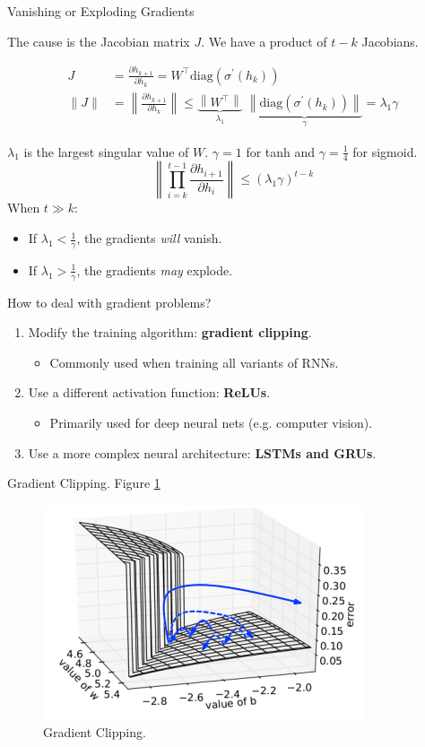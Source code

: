 \documentclass[english]{article}
\begin{document}
\item 
 {Vanishing or Exploding Gradients}

The cause is the Jacobian matrix $J$. We have a product of $t-k$ Jacobians.

\begin{align*}
J&=\frac{\partial h_{k+1}}{\partial h_k}=W^\top\text{diag}(\sigma^\prime(h_k))\\
\|J\|&=\left\|\frac{\partial h_{k+1}}{\partial h_k}\right\|\leq\underbrace{\left\|W^\top\right\|}_{\lambda_1}\;\underbrace{\left\|\text{diag}(\sigma^\prime(h_k))\right\|}_{\gamma}=\lambda_1\gamma
\end{align*}

$\lambda_1$ is the largest singular value of $W$. $\gamma=1$ for tanh and $\gamma=\frac{1}{4}$ for sigmoid.
$$\left\|\prod_{i=k}^{t-1}\frac{\partial h_{i+1}}{\partial h_i}\right\| \leq (\lambda_1\gamma)^{t-k}$$
When $t \gg k$:
\begin{itemize}
\item
If $\lambda_1<\frac{1}{\gamma}$, the gradients \textit{will} vanish.
\item
If $\lambda_1>\frac{1}{\gamma}$, the gradients \textit{may} explode.
\end{itemize}
 

\item 
 {How to deal with gradient problems?}

\begin{enumerate}
\item Modify the training algorithm: \textbf{gradient clipping}.
\begin{itemize}
\item Commonly used when training all variants of RNNs.
\end{itemize}
\item Use a different activation function: \textbf{ReLUs}.
\begin{itemize}
\item Primarily used for deep neural nets (e.g. computer vision).
\end{itemize}
\item Use a more complex neural architecture: \textbf{LSTMs and GRUs}.
\end{enumerate}
 

\item 
 {Gradient Clipping}. Figure \ref{Gradient Clipping}

\begin{figure}
\centering
\includegraphics[height=0.35\linewidth]{gradient-clip2.png}
    \caption{Gradient Clipping.}
    \label{Gradient Clipping}
\end{figure}
\end{document}
